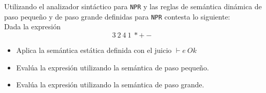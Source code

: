     \begin{exercise}
        Utilizando el analizador sintáctico para \texttt{NPR} y las reglas de semántica dinámica de paso pequeño y de paso grande definidas para \texttt{NPR} contesta lo siguiente: \\

        Dada la expresión $$3\ 2\ 4\ 1 \ * + -\ $$ 
	\begin{itemize}
		\item Aplica la semántica estática definida con el juicio $\vdash e\ Ok$
        		\item Evalúa la expresión utilizando la semántica de paso pequeño.
        		\item Evalúa la expresión utilizando la semántica de paso grande.
	\end{itemize}
    \end{exercise}




